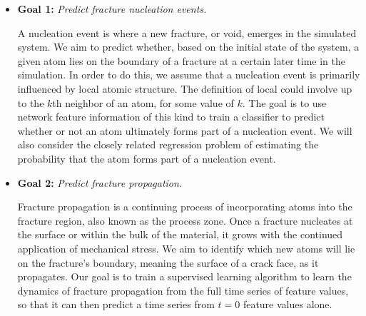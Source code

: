 \begin{itemize}
\item \textbf{Goal 1:} \emph{Predict fracture nucleation events.} 

A nucleation event is where a new fracture, or void, emerges in the simulated system.  We aim to predict whether, based on the initial state of the system, a given atom lies on the boundary of a fracture at a certain later time in the simulation.  In order to do this, we assume that a nucleation event is primarily influenced by local atomic structure.  The definition of local could involve up to the $k$th neighbor of an atom, for some value of $k$.  The goal is to use network feature information of this kind to train a classifier to predict whether or not an atom ultimately forms part of a nucleation event.  We will also consider the closely related regression problem of estimating the probability that the atom forms part of a nucleation event.


\item \textbf{Goal 2:} \emph{Predict fracture propagation.} 

Fracture propagation is a continuing process of incorporating atoms into the fracture region, also known as the process zone.
Once a fracture nucleates at the surface or within the bulk of the material, it grows with the continued application of mechanical stress.  We aim to identify which new atoms will lie on the fracture's boundary, meaning the surface of a crack face, as it propagates.  Our goal is to train a supervised learning algorithm to learn the dynamics of fracture propagation from the full time series of feature values, so that it can then predict a time series from $t=0$ feature values alone.


\end{itemize}

